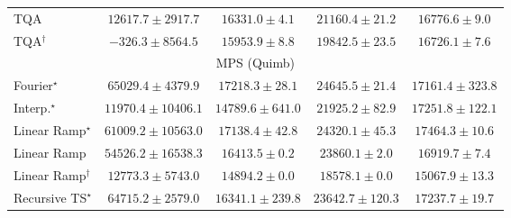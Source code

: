 \begin{tabular}{l|cccc|}
TQA & {\cellcolor[HTML]{CBDCEB}} \color[HTML]{000000} $12617.7\pm 2917.7$ & {\cellcolor[HTML]{C0D4E6}} \color[HTML]{000000} $16331.0\pm 4.1$ & {\cellcolor[HTML]{B1C9E1}} \color[HTML]{000000} $21160.4\pm 21.2$ & {\cellcolor[HTML]{BFD3E6}} \color[HTML]{000000} $16776.6\pm 9.0$ \\
TQA$^\dagger$ & {\cellcolor[HTML]{EEF5F9}} \color[HTML]{000000} $-326.3\pm 8564.5$ & {\cellcolor[HTML]{C1D4E7}} \color[HTML]{000000} $15953.9\pm 8.8$ & {\cellcolor[HTML]{B5CCE3}} \color[HTML]{000000} $19842.5\pm 23.5$ & {\cellcolor[HTML]{BFD3E6}} \color[HTML]{000000} $16726.1\pm 7.6$ \\
\cline{1-5}
\multicolumn{5}{c}{\rule{0pt}{8pt}MPS (Quimb)} \\
\midrule
Fourier$^\star$ & {\cellcolor[HTML]{B34003}} \color[HTML]{F1F1F1} $65029.4\pm 4379.9$ & {\cellcolor[HTML]{FEE28E}} \color[HTML]{000000} $17218.3\pm 28.1$ & {\cellcolor[HTML]{FECC61}} \color[HTML]{000000} $24645.5\pm 21.4$ & {\cellcolor[HTML]{FEE28E}} \color[HTML]{000000} $17161.4\pm 323.8$ \\
Interp.$^\star$ & {\cellcolor[HTML]{FEECA4}} \color[HTML]{000000} $11970.4\pm 10406.1$ & {\cellcolor[HTML]{FEE799}} \color[HTML]{000000} $14789.6\pm 641.0$ & {\cellcolor[HTML]{FED471}} \color[HTML]{000000} $21925.2\pm 82.9$ & {\cellcolor[HTML]{FEE28E}} \color[HTML]{000000} $17251.8\pm 122.1$ \\
Linear Ramp$^\star$ & {\cellcolor[HTML]{C64902}} \color[HTML]{F1F1F1} $61009.2\pm 10563.0$ & {\cellcolor[HTML]{FEE28E}} \color[HTML]{000000} $17138.4\pm 42.8$ & {\cellcolor[HTML]{FECD63}} \color[HTML]{000000} $24320.1\pm 45.3$ & {\cellcolor[HTML]{FEE18C}} \color[HTML]{000000} $17464.3\pm 10.6$ \\
Linear Ramp & {\cellcolor[HTML]{DB5D0B}} \color[HTML]{F1F1F1} $54526.2\pm 16538.3$ & {\cellcolor[HTML]{FEE392}} \color[HTML]{000000} $16413.5\pm 0.2$ & {\cellcolor[HTML]{FECE65}} \color[HTML]{000000} $23860.1\pm 2.0$ & {\cellcolor[HTML]{FEE390}} \color[HTML]{000000} $16919.7\pm 7.4$ \\
Linear Ramp$^\dagger$ & {\cellcolor[HTML]{FEEAA1}} \color[HTML]{000000} $12773.3\pm 5743.0$ & {\cellcolor[HTML]{FEE799}} \color[HTML]{000000} $14894.2\pm 0.0$ & {\cellcolor[HTML]{FEDE86}} \color[HTML]{000000} $18578.1\pm 0.0$ & {\cellcolor[HTML]{FEE697}} \color[HTML]{000000} $15067.9\pm 13.3$ \\
Recursive TS$^\star$ & {\cellcolor[HTML]{B44103}} \color[HTML]{F1F1F1} $64715.2\pm 2579.0$ & {\cellcolor[HTML]{FEE392}} \color[HTML]{000000} $16341.1\pm 239.8$ & {\cellcolor[HTML]{FECF67}} \color[HTML]{000000} $23642.7\pm 120.3$ & {\cellcolor[HTML]{FEE28E}} \color[HTML]{000000} $17237.7\pm 19.7$ \\

\end{tabular}
